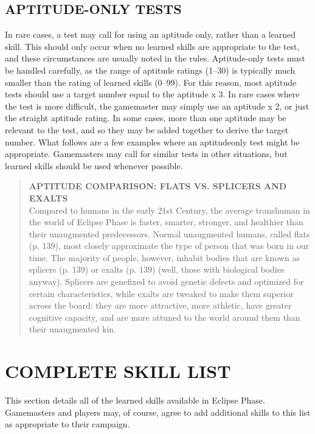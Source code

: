 \subsection{APTITUDE-ONLY TESTS}
In rare cases, a test may call for using an aptitude
only, rather than a learned skill. This should only
occur when no learned skills are appropriate to the
test, and these circumstances are usually noted in
the rules.
Aptitude-only tests must be handled carefully, as
the range of aptitude ratings (1–30) is typically much
smaller than the rating of learned skills (0–99). For
this reason, most aptitude tests should use a target
number equal to the aptitude x 3. In rare cases where
the test is more difficult, the gamemaster may simply
use an aptitude x 2, or just the straight aptitude rating.
In some cases, more than one aptitude may be relevant
to the test, and so they may be added together
to derive the target number.
What follows are a few examples where an aptitudeonly
test might be appropriate. Gamemasters may call
for similar tests in other situations, but learned skills
should be used whenever possible.



\begin{quotation}
\textbf{APTITUDE COMPARISON: FLATS VS. SPLICERS AND EXALTS}
\\
Compared to humans in the early 21st Century, the average transhuman in the world of Eclipse Phase is faster,
smarter, stronger, and healthier than their unaugmented predecessors. Normal unaugmented humans, called
flats (p. 139), most closely approximate the type of person that was born in our time. The majority of people,
however, inhabit bodies that are known as splicers (p. 139) or exalts (p. 139) (well, those with biological bodies
anyway). Splicers are genefixed to avoid genetic defects and optimized for certain characteristics, while exalts
are tweaked to make them superior across the board: they are more attractive, more athletic, have greater
cognitive capacity, and are more attuned to the world around them than their unaugmented kin.
\end{quotation}


\section{COMPLETE SKILL LIST}



This section details all of the learned skills available
in Eclipse Phase. Gamemasters and players
may, of course, agree to add additional skills to
this list as appropriate to their campaign.

